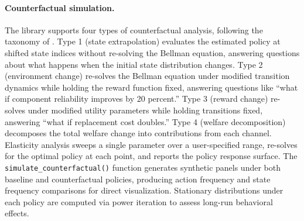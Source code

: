 \paragraph{Counterfactual simulation.}
The library supports four types of counterfactual analysis, following the taxonomy of \citet{aguirregabiriaMira2010}.
Type 1 (state extrapolation) evaluates the estimated policy at shifted state indices without re-solving the Bellman equation, answering questions about what happens when the initial state distribution changes.
Type 2 (environment change) re-solves the Bellman equation under modified transition dynamics while holding the reward function fixed, answering questions like ``what if component reliability improves by 20 percent.''
Type 3 (reward change) re-solves under modified utility parameters while holding transitions fixed, answering ``what if replacement cost doubles.''
Type 4 (welfare decomposition) decomposes the total welfare change into contributions from each channel.
Elasticity analysis sweeps a single parameter over a user-specified range, re-solves for the optimal policy at each point, and reports the policy response surface.
The \texttt{simulate\_counterfactual()} function generates synthetic panels under both baseline and counterfactual policies, producing action frequency and state frequency comparisons for direct visualization.
Stationary distributions under each policy are computed via power iteration to assess long-run behavioral effects.
